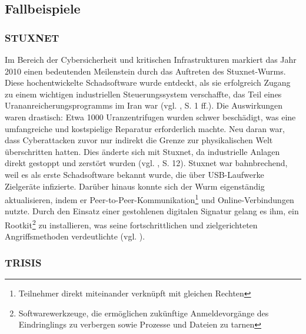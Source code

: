 \subsection{Fallbeispiele}
\subsubsection{STUXNET}

Im Bereich der Cybersicherheit und kritischen Infrastrukturen markiert das Jahr 2010 einen bedeutenden Meilenstein durch das Auftreten des Stuxnet-Wurms. Diese hochentwickelte Schadsoftware wurde entdeckt, als sie erfolgreich Zugang zu einem wichtigen industriellen Steuerungssystem verschaffte, das Teil eines Urananreicherungsprogramms im Iran war (vgl. \cite{Stuxnet}, S. 1 ff.). Die Auswirkungen waren drastisch: Etwa 1000 Uranzentrifugen wurden schwer beschädigt, was eine umfangreiche und kostspielige Reparatur erforderlich machte. Neu daran war, dass Cyberattacken zuvor nur indirekt die Grenze zur physikalischen Welt überschritten hatten. Dies änderte sich mit Stuxnet, da industrielle Anlagen direkt gestoppt und zerstört wurden (vgl. \cite{Fraunhofer}, S. 12). Stuxnet war bahnbrechend, weil es als erste Schadsoftware bekannt wurde, die über USB-Laufwerke Zielgeräte infizierte. Darüber hinaus konnte sich der Wurm eigenständig aktualisieren, indem er Peer-to-Peer-Kommunikation\footnote{Teilnehmer direkt miteinander verknüpft mit gleichen Rechten} und Online-Verbindungen nutzte. Durch den Einsatz einer gestohlenen digitalen Signatur gelang es ihm, ein Rootkit\footnote{Softwarewerkzeuge, die ermöglichen zukünftige Anmeldevorgänge des Eindringlings zu verbergen sowie Prozesse und Dateien zu tarnen} zu installieren, was seine fortschrittlichen und zielgerichteten Angriffsmethoden verdeutlichte (vgl. \cite{NordVPN}).
\clearpage
\subsubsection{TRISIS}


